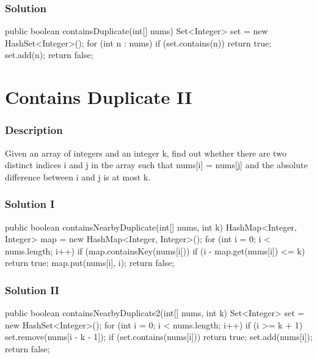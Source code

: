 \subsubsection{Solution}

\begin{Code}
public boolean containsDuplicate(int[] nums) {
    Set<Integer> set = new HashSet<Integer>();
    for (int n : nums) {
        if (set.contains(n)) {
            return true;
        }
        set.add(n);
    }
    return false;
}
\end{Code}

\newpage

\section{Contains Duplicate II} %

\subsubsection{Description}
Given an array of integers and an integer k, find out whether there are two distinct indices i and j in the array such that nums[i] = nums[j] and the absolute difference between i and j is at most k.

\subsubsection{Solution I}

\begin{Code}
public boolean containsNearbyDuplicate(int[] nums, int k) {
    HashMap<Integer, Integer> map = new HashMap<Integer, Integer>();
    for (int i = 0; i < nums.length; i++) {
        if (map.containsKey(nums[i])) {
            if (i - map.get(nums[i]) <= k) {
                return true;
            }
        }
        map.put(nums[i], i);
    }
    return false;
}
\end{Code}

\subsubsection{Solution II}
\begin{Code}
public boolean containsNearbyDuplicate2(int[] nums, int k) {
    Set<Integer> set = new HashSet<Integer>();
    for (int i = 0; i < nums.length; i++) {
        if (i >= k + 1) {
            set.remove(nums[i - k - 1]);
        }
        if (set.contains(nums[i])) {
            return true;
        }
        set.add(nums[i]);
    }
    return false;
}
\end{Code}

